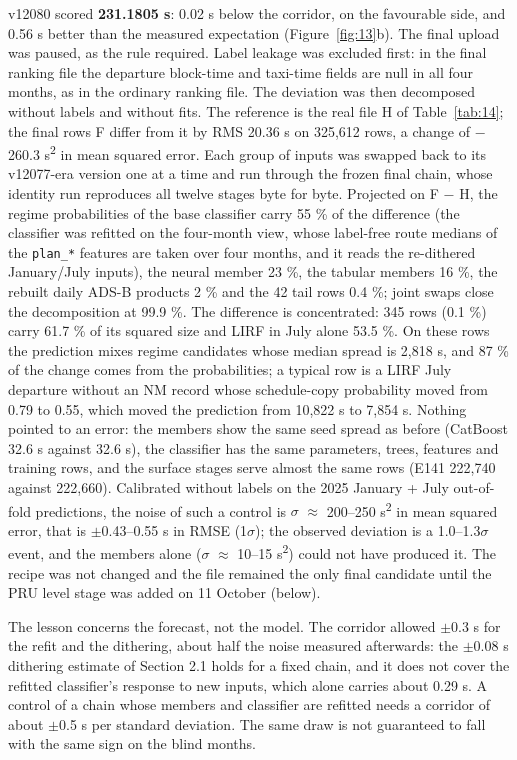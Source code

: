 \documentclass[11pt,a4paper]{article}
\begin{document}
v12080 scored \textbf{231.1805 s}: 0.02 s below the corridor, on the favourable side, and 0.56 s better than the measured expectation (Figure~\ref{fig:13}b). The final upload was paused, as the rule required. Label leakage was excluded first: in the final ranking file the departure block-time and taxi-time fields are null in all four months, as in the ordinary ranking file. The deviation was then decomposed without labels and without fits. The reference is the real file H of Table~\ref{tab:14}; the final rows F differ from it by RMS 20.36 s on 325,612 rows, a change of $-$260.3 s\textsuperscript{2} in mean squared error. Each group of inputs was swapped back to its v12077-era version one at a time and run through the frozen final chain, whose identity run reproduces all twelve stages byte for byte. Projected on F $-$ H, the regime probabilities of the base classifier carry 55 \% of the difference (the classifier was refitted on the four-month view, whose label-free route medians of the \texttt{plan\_\allowbreak{}*} features are taken over four months, and it reads the re-dithered January/July inputs), the neural member 23 \%, the tabular members 16 \%, the rebuilt daily ADS-B products 2 \% and the 42 tail rows 0.4 \%; joint swaps close the decomposition at 99.9 \%. The difference is concentrated: 345 rows (0.1 \%) carry 61.7 \% of its squared size and LIRF in July alone 53.5 \%. On these rows the prediction mixes regime candidates whose median spread is 2,818 s, and 87 \% of the change comes from the probabilities; a typical row is a LIRF July departure without an NM record whose schedule-copy probability moved from 0.79 to 0.55, which moved the prediction from 10,822 s to 7,854 s. Nothing pointed to an error: the members show the same seed spread as before (CatBoost 32.6 s against 32.6 s), the classifier has the same parameters, trees, features and training rows, and the surface stages serve almost the same rows (E141 222,740 against 222,660). Calibrated without labels on the 2025 January + July out-of-fold predictions, the noise of such a control is $\sigma$ $\approx$ 200--250 s\textsuperscript{2} in mean squared error, that is $\pm$0.43--0.55 s in RMSE (1$\sigma$); the observed deviation is a 1.0--1.3$\sigma$ event, and the members alone ($\sigma$ $\approx$ 10--15 s\textsuperscript{2}) could not have produced it. The recipe was not changed and the file remained the only final candidate until the PRU level stage was added on 11 October (below).

The lesson concerns the forecast, not the model. The corridor allowed $\pm$0.3 s for the refit and the dithering, about half the noise measured afterwards: the $\pm$0.08 s dithering estimate of Section 2.1 holds for a fixed chain, and it does not cover the refitted classifier's response to new inputs, which alone carries about 0.29 s. A control of a chain whose members and classifier are refitted needs a corridor of about $\pm$0.5 s per standard deviation. The same draw is not guaranteed to fall with the same sign on the blind months.
\end{document}
